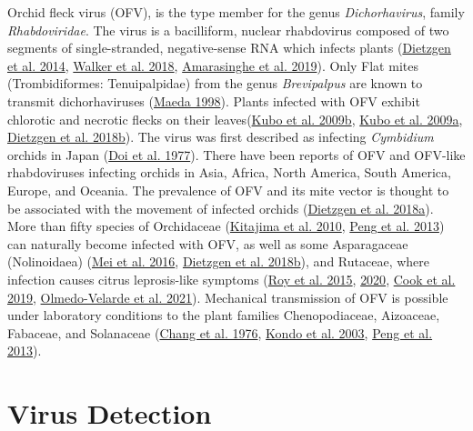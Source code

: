 \documentclass{ufdissertation}[overrideChapters] %
\begin{document}
{Orchid fleck virus (OFV), is the type member for the genus \emph{Dichorhavirus}, family \emph{Rhabdoviridae}. The virus is a bacilliform, nuclear rhabdovirus composed of two segments of single-stranded, negative-sense RNA which infects plants (\protect\hyperlink{ref-Dietzgen2014}{Dietzgen et al. 2014}, \protect\hyperlink{ref-Walker2018}{Walker et al. 2018}, \protect\hyperlink{ref-Amarasinghe2019}{Amarasinghe et al. 2019}). Only Flat mites (Trombidiformes: Tenuipalpidae) from the genus \emph{Brevipalpus} are known to transmit dichorhaviruses (\protect\hyperlink{ref-Maeda1998}{Maeda 1998}). Plants infected with OFV exhibit chlorotic and necrotic flecks on their leaves(\protect\hyperlink{ref-Kubo2009}{Kubo et al. 2009b}, \protect\hyperlink{ref-Kubo2009a}{Kubo et al. 2009a}, \protect\hyperlink{ref-Dietzgen2018a}{Dietzgen et al. 2018b}). The virus was first described as infecting \emph{Cymbidium} orchids in Japan (\protect\hyperlink{ref-Doi1977}{Doi et al. 1977}). There have been reports of OFV and OFV-like rhabdoviruses infecting orchids in Asia, Africa, North America, South America, Europe, and Oceania. The prevalence of OFV and its mite vector is thought to be associated with the movement of infected orchids (\protect\hyperlink{ref-Dietzgen2018}{Dietzgen et al. 2018a}). More than fifty species of Orchidaceae (\protect\hyperlink{ref-Kitajima2010}{Kitajima et al. 2010}, \protect\hyperlink{ref-Peng2013}{Peng et al. 2013}) can naturally become infected with OFV, as well as some Asparagaceae (Nolinoidaea) (\protect\hyperlink{ref-Mei2016}{Mei et al. 2016}, \protect\hyperlink{ref-Dietzgen2018a}{Dietzgen et al. 2018b}), and Rutaceae, where infection causes citrus leprosis-like symptoms (\protect\hyperlink{ref-Roy2015}{Roy et al. 2015}, \protect\hyperlink{ref-Roy2020}{2020}, \protect\hyperlink{ref-Cook2019}{Cook et al. 2019}, \protect\hyperlink{ref-Velarde2021}{Olmedo-Velarde et al. 2021}). Mechanical transmission of OFV is possible under laboratory conditions to the plant families Chenopodiaceae, Aizoaceae, Fabaceae, and Solanaceae (\protect\hyperlink{ref-Chang1976}{Chang et al. 1976}, \protect\hyperlink{ref-Kondo2003}{Kondo et al. 2003}, \protect\hyperlink{ref-Peng2013}{Peng et al. 2013}).

\hypertarget{virus-detection}{%
\section{Virus Detection}\label{virus-detection}}

}
\end{document}
